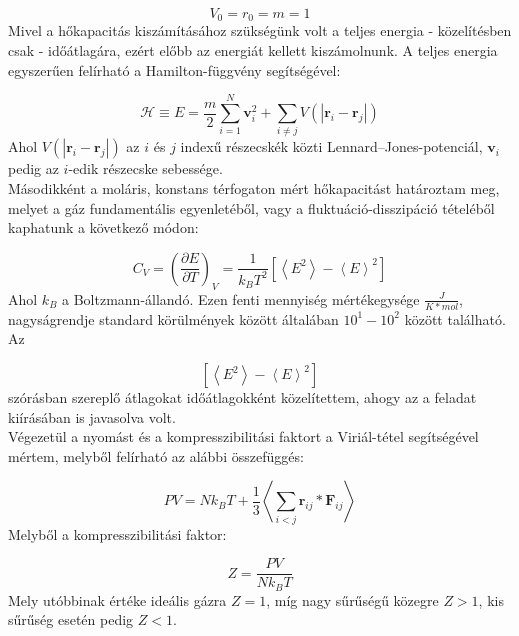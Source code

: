 \begin{multicols}{2}
\begin{equation}
    V_{0} = r_{0} = m = 1
\end{equation}
Mivel a hőkapacitás kiszámításához szükségünk volt a teljes energia - közelítésben csak - időátlagára, ezért előbb az energiát kellett kiszámolnunk. A teljes energia egyszerűen felírható a Hamilton-függvény segítségével:

\begin{equation}
    \mathscr{H}
    \equiv
    E
    =
    \frac{m}{2} \sum_{i = 1}^{N} \boldsymbol{v}_{i}^{2}
    +
    \sum_{i \neq j} V \left( \left| \boldsymbol{r}_{i} - \boldsymbol{r}_{j} \right| \right)
\end{equation}
Ahol $V \left( \left| \boldsymbol{r}_{i} - \boldsymbol{r}_{j} \right| \right)$ az $i$ és $j$ indexű részecskék közti Lennard--Jones-potenciál, $\boldsymbol{v}_{i}$ pedig az $i$-edik részecske sebessége. \\
Másodikként a moláris, konstans térfogaton mért hőkapacitást határoztam meg, melyet a gáz fundamentális egyenletéből, vagy a fluktuáció-disszipáció tételéből kaphatunk\cite{fluct} a következő módon:

\begin{equation}
    C_{V}
    =
    \left( \frac{\partial E}{\partial T} \right)_{V}
    =
    \frac{1}{k_{B} T^{2}} \left[ \left< E^{2} \right> - \left< E \right>^{2} \right]
\end{equation}
Ahol $k_{B}$ a Boltzmann-állandó. Ezen fenti mennyiség mértékegysége $\frac{J}{K * mol}$, nagyságrendje standard körülmények között általában $10^{1} - 10^{2}$ között található\cite{thornton2012modern}. Az

\begin{equation}
    \left[ \left< E^{2} \right> - \left< E \right>^{2} \right]
\end{equation}
szórásban szereplő átlagokat időátlagokként közelítettem, ahogy az a feladat kiírásában is javasolva volt\cite{szamszim}. \\
Végezetül a nyomást és a kompresszibilitási faktort a Viriál-tétel segítségével mértem, melyből felírható az alábbi összefüggés:

\begin{equation}
    PV
    =
    N k_{B} T
    +
    \frac{1}{3} \left< \sum_{i < j} \boldsymbol{r}_{ij} * \boldsymbol{F}_{ij} \right>
\end{equation}
Melyből a kompresszibilitási faktor:

\begin{equation}
    Z
    =
    \frac{PV}{N k_{B} T}
\end{equation}
Mely utóbbinak értéke ideális gázra $Z = 1$, míg nagy sűrűségű közegre $Z > 1$, kis sűrűség esetén pedig $Z < 1$.


\end{multicols}
